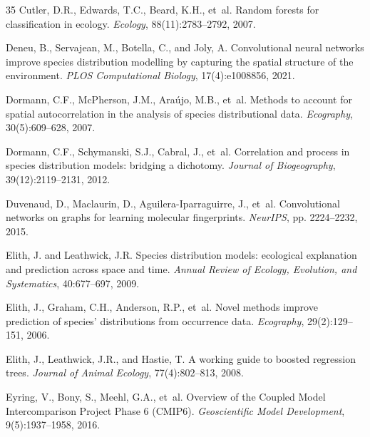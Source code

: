 \documentclass[11pt,a4paper]{article}
\begin{document}
\begin{thebibliography}{35}
Cutler, D.R., Edwards, T.C., Beard, K.H., et~al.
\newblock Random forests for classification in ecology.
\newblock \emph{Ecology}, 88(11):2783--2792, 2007.

Deneu, B., Servajean, M., Botella, C., and Joly, A.
\newblock Convolutional neural networks improve species distribution modelling
  by capturing the spatial structure of the environment.
\newblock \emph{PLOS Computational Biology}, 17(4):e1008856, 2021.

Dormann, C.F., McPherson, J.M., Ara{\'u}jo, M.B., et~al.
\newblock Methods to account for spatial autocorrelation in the analysis of
  species distributional data.
\newblock \emph{Ecography}, 30(5):609--628, 2007.

Dormann, C.F., Schymanski, S.J., Cabral, J., et~al.
\newblock Correlation and process in species distribution models: bridging a
  dichotomy.
\newblock \emph{Journal of Biogeography}, 39(12):2119--2131, 2012.

Duvenaud, D., Maclaurin, D., Aguilera-Iparraguirre, J., et~al.
\newblock Convolutional networks on graphs for learning molecular fingerprints.
\newblock \emph{NeurIPS}, pp. 2224--2232, 2015.

Elith, J. and Leathwick, J.R.
\newblock Species distribution models: ecological explanation and prediction
  across space and time.
\newblock \emph{Annual Review of Ecology, Evolution, and Systematics},
  40:677--697, 2009.

Elith, J., Graham, C.H., Anderson, R.P., et~al.
\newblock Novel methods improve prediction of species' distributions from
  occurrence data.
\newblock \emph{Ecography}, 29(2):129--151, 2006.

Elith, J., Leathwick, J.R., and Hastie, T.
\newblock A working guide to boosted regression trees.
\newblock \emph{Journal of Animal Ecology}, 77(4):802--813, 2008.

Eyring, V., Bony, S., Meehl, G.A., et~al.
\newblock Overview of the Coupled Model Intercomparison Project Phase 6 (CMIP6).
\newblock \emph{Geoscientific Model Development}, 9(5):1937--1958, 2016.


\end{thebibliography}
\end{document}
